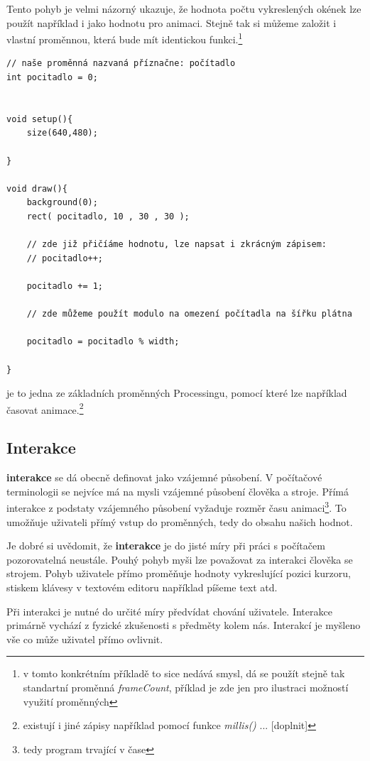 \documentclass[12pt,twopage]{book}
\newcommand{\pododdil}[1]{\subsection{#1}\label{subsec:#1}}
\newcommand{\slovnik}[1]{\textbf{\gls{#1}}\index{#1}}
\newcommand{\Slovnik}[1]{\textbf{\Gls{#1}}\index{#1}}
\newcommand{\vyraz}[1]{\textit{\gls{#1}}\index{#1}}
\begin{document}
Tento pohyb je velmi názorný ukazuje, že hodnota počtu vykreslených okének lze použít například i jako hodnotu pro animaci. Stejně tak si můžeme založit i vlastní proměnnou, která bude mít identickou funkci.\footnote{v tomto konkrétním příkladě to sice nedává smysl, dá se použít stejně tak standartní proměnná \vyraz{frameCount}, příklad je zde jen pro ilustraci možností využití proměnných}

\begin{lstlisting}
// naše proměnná nazvaná příznačne: počítadlo
int pocitadlo = 0;


void setup(){
	size(640,480);
	
}

void draw(){
	background(0);
	rect( pocitadlo, 10 , 30 , 30 );

	// zde již přičíáme hodnotu, lze napsat i zkrácným zápisem:
	// pocitadlo++;

	pocitadlo += 1;

	// zde můžeme použít modulo na omezení počítadla na šířku plátna

	pocitadlo = pocitadlo % width;

}

\end{lstlisting}

 je to jedna ze základních proměnných Processingu, pomocí které lze například časovat animace.\footnote{existují i jiné zápisy například pomocí funkce \vyraz{millis()} ... [doplnit]}



\pododdil{Interakce}

\Slovnik{interakce} se dá obecně definovat jako vzájemné působení. V počítačové terminologii se nejvíce má na mysli vzájemné působení člověka a stroje. Přímá interakce z podstaty vzájemného působení vyžaduje rozměr času animaci\footnote{tedy program trvající v čase}. To umožňuje uživateli přímý vstup do proměnných, tedy do obsahu našich hodnot.

Je dobré si uvědomit, že \slovnik{interakce} je do jisté míry při práci s počítačem pozorovatelná neustále. Pouhý pohyb myši lze považovat za interakci člověka se strojem. Pohyb uživatele přímo proměňuje hodnoty vykreslující pozici kurzoru, stiskem klávesy v textovém editoru například píšeme text atd.

Při interakci je nutné do určité míry předvídat chování uživatele. Interakce primárně vychází z fyzické zkušenosti s předměty kolem nás. Interakcí je myšleno vše co může uživatel přímo ovlivnit.
\end{document}
